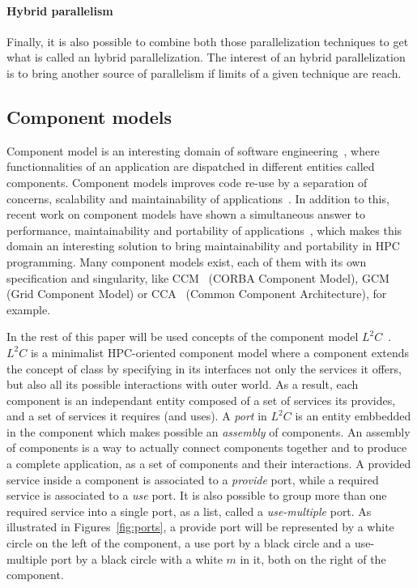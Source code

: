 \paragraph{Hybrid parallelism} Finally, it is also possible to combine both those parallelization techniques to get what is called an hybrid parallelization. The interest of an hybrid parallelization is to bring another source of parallelism if limits of a given technique are reach.

\subsection{Component models}
Component model is an interesting domain of software engineering~\cite{Szyperski:2002:CSB:515228}, where functionnalities of an application are dispatched in different entities called components. Component models improves code re-use by a separation of concerns, scalability and maintainability of applications~\cite{Szyperski:2002:CSB:515228,bigot:inria-00388508}. In addition to this, recent work on component models have shown a simultaneous answer to performance, maintainability and portability of applications~\cite{l2c}, which makes this domain an interesting solution to bring maintainability and portability in HPC programming.
Many component models exist, each of them with its own specification and singularity, like CCM~\cite{corba:omg06} (CORBA Component Model), GCM~\cite{Baude} (Grid Component Model) or CCA~\cite{Armstrong:1999:TCC:822084.823232} (Common Component Architecture), for example. 

In the rest of this paper will be used concepts of the component model $L^2C$~\cite{l2c}. $L^2C$ is a minimalist HPC-oriented component model where a component extends the concept of class by specifying in its interfaces not only the services it offers, but also all its possible interactions with outer world. As a result, each component is an independant entity composed of a set of services its provides, and a set of services it requires (and uses). 
A \emph{port} in $L^2C$ is an entity embbedded in the component which makes possible an \emph{assembly} of components. An assembly of components is a way to actually connect components together and to produce a complete application, as a set of components and their interactions. A provided service inside a component is associated to a \emph{provide} port, while a required service is associated to a \emph{use} port. It is also possible to group more than one required service into a single port, as a list, called a \emph{use-multiple} port. As illustrated in Figures~\ref{fig:ports}, a provide port will be represented by a white circle on the left of the component, a use port by a black circle and a use-multiple port by a black circle with a white $m$ in it, both on the right of the component.

